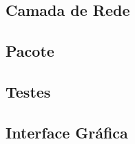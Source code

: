 \documentclass[brazil,times,12pt]{abnt}
\begin{document}
	\subsection*{Camada de Rede}
	

	\subsection*{Pacote}
	

	\subsection*{Testes}
	
	
	\subsection*{Interface Gráfica}
	
	



\end{document}
